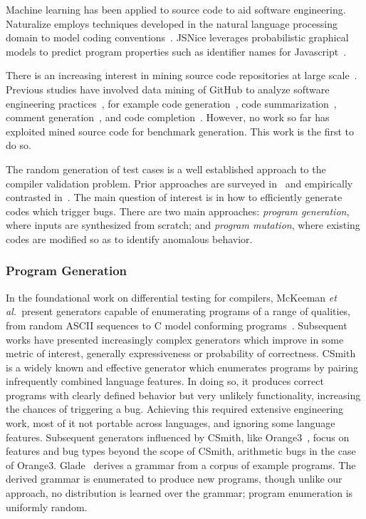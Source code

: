 Machine learning has been applied to source code to aid software engineering. Naturalize employs techniques developed in the natural language processing domain to model coding conventions~\cite{Allamanis2014a}. JSNice leverages probabilistic graphical models to predict program properties such as identifier names for Javascript~\cite{Raychev}.

There is an increasing interest in mining source code repositories at large scale~\cite{Allamanis2013a,White2015a,Bird2009}. Previous studies have involved data mining of GitHub to analyze software engineering practices~\cite{Wu2014,Guzman2014,Baishakhi2014a,Vasilescu2015}, for example code generation~\cite{Zhang2015a}, code summarization~\cite{Allamanis2016}, comment generation~\cite{Wong2013}, and code completion~\cite{Raychev2014}. However, no work so far has exploited mined source code for benchmark generation. This work is the first to do so.



The random generation of test cases is a well established approach to the
compiler validation problem. Prior approaches are surveyed
in~\cite{Kossatchev2005,Boujarwah1997} and empirically contrasted
in~\cite{Chen2014a}. The main question of interest is in how to efficiently
generate codes which trigger bugs. There are two main approaches: \emph{program
	generation}, where inputs are synthesized from scratch; and \emph{program
	mutation}, where existing codes are modified so as to identify anomalous
behavior.

\subsubsection{Program Generation}

In the foundational work on differential testing for compilers, McKeeman
\emph{et al.\ }present generators capable of enumerating programs of a range of
qualities, from random ASCII sequences to C model conforming
programs~\cite{McKeeman1998}. Subsequent works have presented increasingly
complex generators which improve in some metric of interest, generally
expressiveness or probability of correctness. CSmith~\cite{Yang2011} is a widely
known and effective generator which enumerates programs by pairing infrequently
combined language features. In doing so, it produces correct programs with
clearly defined behavior but very unlikely functionality, increasing the chances
of triggering a bug. Achieving this required extensive engineering work, most of
it not portable across languages, and ignoring some language features.
Subsequent generators influenced by CSmith, like Orange3~\cite{Nagai2013}, focus
on features and bug types beyond the scope of CSmith, arithmetic bugs in the
case of Orange3. Glade~\cite{Bastani2017} derives a grammar from a corpus of
example programs. The derived grammar is enumerated to produce new programs,
though unlike our approach, no distribution is learned over the grammar; program
enumeration is uniformly random.

